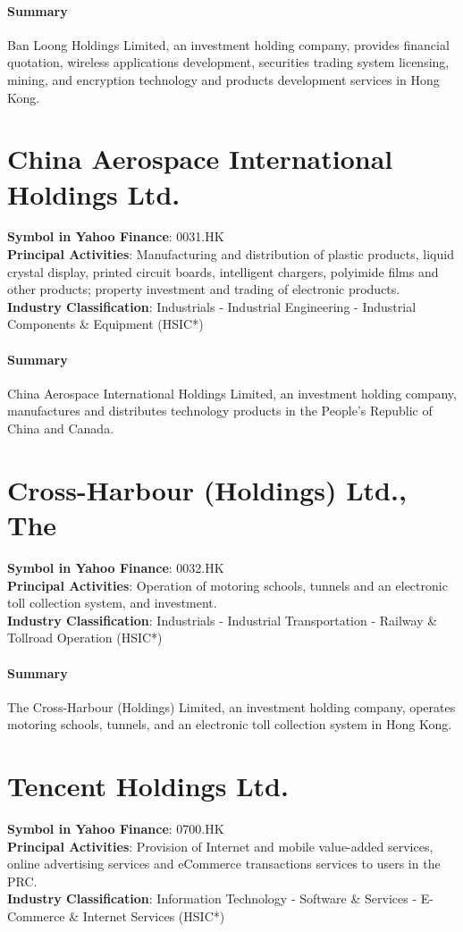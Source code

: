 \paragraph{Summary}
Ban Loong Holdings Limited, an investment holding company, provides financial quotation, wireless applications development, securities trading system licensing, mining, and encryption technology and products development services in Hong Kong.


\section{China Aerospace International Holdings Ltd.}
\textbf{Symbol in Yahoo Finance}: 0031.HK\\
\textbf{Principal Activities}: Manufacturing and distribution of plastic products, liquid crystal display, printed circuit boards, intelligent chargers, polyimide films and other products; property investment and trading of electronic products.\\
\textbf{Industry Classification}: Industrials - Industrial Engineering - Industrial Components \& Equipment (HSIC*)
\paragraph{Summary}
China Aerospace International Holdings Limited, an investment holding company, manufactures and distributes technology products in the People's Republic of China and Canada.


\section{Cross-Harbour (Holdings) Ltd., The}
\textbf{Symbol in Yahoo Finance}: 0032.HK\\
\textbf{Principal Activities}: Operation of motoring schools, tunnels and an electronic toll collection system, and investment.\\
\textbf{Industry Classification}: Industrials - Industrial Transportation - Railway \& Tollroad Operation (HSIC*)
\paragraph{Summary}
The Cross-Harbour (Holdings) Limited, an investment holding company, operates motoring schools, tunnels, and an electronic toll collection system in Hong Kong.


\section{Tencent Holdings Ltd.}
\textbf{Symbol in Yahoo Finance}: 0700.HK\\
\textbf{Principal Activities}: Provision of Internet and mobile value-added services, online advertising services and eCommerce transactions services to users in the PRC.\\
\textbf{Industry Classification}: Information Technology - Software \& Services - E-Commerce \& Internet Services (HSIC*)
